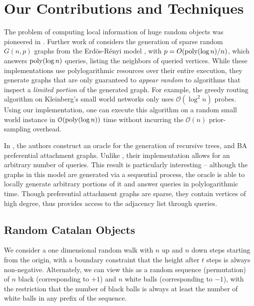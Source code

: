 \section{Our Contributions and Techniques}
\label{sec:our_contributions_and_techniques}

The problem of computing local information of huge random objects was pioneered in \cite{huge_old,huge}.
Further work of \cite{sparse} considers the generation of sparse random $G(n,p)$ graphs from the Erd\"{o}s-R\'{e}nyi model \cite{er},
with $p = O(\mathrm{poly}(\log n)/n)$, which answers $\mathrm{poly}(\log n)$  queries, listing the neighbors of queried vertices.
While these implementations use polylogarithmic resources over their entire execution,
they generate graphs that are  only guaranteed to {\em appear random} to algorithms that inspect a {\em limited portion} of the generated graph.
For example, the greedy routing algorithm on Kleinberg's small world networks \cite{kleinberg} only uses $\mathcal O(\log^2 n)$ probes.
Using our implementation, one can execute this algorithm on a random small world instance
in $\mathcal O(\mathrm{poly}(\log n))$ time without incurring the $\mathcal O(n)$ prior-sampling overhead.

In \cite{reut}, the authors construct an oracle for the generation of recursive trees, and BA preferential attachment graphs.
Unlike \cite{sparse}, their implementation allows for an arbitrary number of queries.
This result is particularly interesting --  although the graphs in this model are generated via a sequential process,
the oracle is able to locally generate arbitrary portions of it and answer queries in polylogarithmic time.
Though preferential attachment graphs are sparse, they contain vertices of high degree,
thus \cite{reut} provides access to the adjacency list through  queries.










\subsection{Random Catalan Objects}
\label{sec:overview_catalan_objects}
We consider a one dimensional random walk with $n$ up and $n$ down steps starting from the origin,
with a boundary constraint that the height after $t$ steps is always non-negative.
Alternately, we can view this as a random sequence (permutation) of $n$ black (corresponding to $+1$) and $n$ white balls (corresponding to $-1$),
with the restriction that the number of black balls is always at least the number of white balls in any prefix of the sequence.

